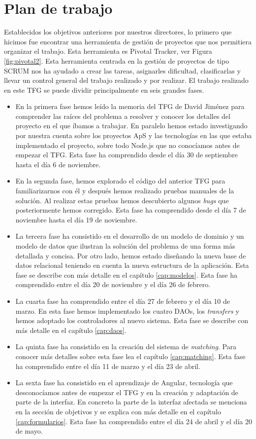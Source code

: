 \documentclass[11pt]{book}
\begin{document}
	\section{Plan de trabajo}
	Establecidos los objetivos anteriores por nuestros directores, lo primero que hicimos fue encontrar una herramienta de gestión de proyectos que nos permitiera organizar el trabajo. Esta herramienta es Pivotal Tracker, ver Figura \ref{fig:pivotal2}. Esta herramienta centrada en la gestión de proyectos de tipo SCRUM nos ha ayudado a crear las tareas, asignarles dificultad, clasificarlas y llevar un control general del trabajo realizado y por realizar. El trabajo realizado en este TFG se puede dividir principalmente en seis grandes fases.
	\begin{itemize} 
		\item En la primera fase hemos leído la memoria del TFG de David Jiménez para comprender las raíces del problema a resolver y conocer los detalles del proyecto en el que íbamos a trabajar. En paralelo hemos estado investigando por nuestra cuenta sobre los proyectos ApS y las tecnologías en las que estaba implementado el proyecto, sobre todo Node.js que no conocíamos antes de empezar el TFG. Esta fase ha comprendido desde el día 30 de septiembre hasta el día 6 de noviembre.
		\item En la segunda fase, hemos explorado el código del anterior TFG para familiarizarnos con él y después hemos realizado pruebas manuales de la solución. Al realizar estas pruebas hemos descubierto algunos \textit{bugs} que posteriormente hemos corregido. Esta fase ha comprendido desde el día 7 de noviembre hasta el día 19 de noviembre.
		\item La tercera fase ha consistido en el desarrollo de un modelo de dominio y un modelo de datos que ilustran la solución del problema de una forma más detallada y concisa. Por otro lado, hemos estado diseñando la nueva base de datos relacional teniendo en cuenta la nueva estructura de la aplicación. Esta fase se describe con más detalle en el capítulo \ref{cap:modelos}. Esta fase ha comprendido entre el día 20 de noviembre y el día 26 de febrero.
		\item La cuarta fase ha comprendido entre el día 27 de febrero y el día 10 de marzo. En esta fase hemos implementado los cuatro DAOs, los \textit{transfers} y hemos adoptado los controladores al nuevo sistema. Esta fase se describe con más detalle en el capítulo \ref{cap:daos}.
		\item La quinta fase ha consistido en la creación del sistema de \textit{matching}. Para conocer más detalles sobre esta fase lea el capítulo \ref{cap:matching}. Esta fase ha comprendido entre el día 11 de marzo y el día 23 de abril.
		\item La sexta fase ha consistido en el aprendizaje de Angular, tecnología que desconocíamos antes de empezar el TFG y en la creación y adaptación de parte de la interfaz. En concreto la parte de la interfaz afectada se menciona en la sección de objetivos y se explica con más detalle en el capítulo \ref{cap:formularios}. Esta fase ha comprendido entre el día 24 de abril y el día 20 de mayo.
		

\end{itemize}
\end{document}
